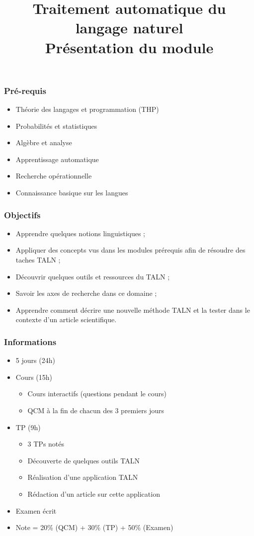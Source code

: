 \documentclass{beamer}
\title[TALN : Présentation] %
{Traitement automatique du langage naturel\\Présentation du module}
\begin{document}
\begin{frame}
\frametitle{Pré-requis}

\begin{itemize}
	\item Théorie des langages et programmation (THP)
	\item Probabilités et statistiques
	\item Algèbre et analyse 
	\item Apprentissage automatique 
	\item Recherche opérationnelle
	\item Connaissance basique sur les langues
\end{itemize}

\end{frame}


\begin{frame}
\frametitle{Objectifs}

\begin{itemize}
	\item Apprendre quelques notions linguistiques ;
	\item Appliquer des concepts vus dans les modules prérequis afin de résoudre des taches TALN ;
	\item Découvrir quelques outils et ressources du TALN ;
	\item Savoir les axes de recherche dans ce domaine ;
	\item Apprendre comment décrire une nouvelle méthode TALN et la tester dans le contexte d'un article scientifique.
\end{itemize}

\end{frame}


\begin{frame}
\frametitle{Informations}

\begin{itemize}
	\item 5 jours (24h)
	\item Cours (15h)
	\begin{itemize}
		\item Cours interactifs (questions pendant le cours)
		\item QCM à la fin de chacun des 3 premiers jours
	\end{itemize}
	\item TP (9h)
	\begin{itemize}
		\item 3 TPs notés
		\item Découverte de quelques outils TALN
		\item Réalisation d'une application TALN
		\item Rédaction d'un article sur cette application
	\end{itemize}
	\item Examen écrit 
	\item Note = 20\% (QCM) + 30\% (TP) + 50\% (Examen)
\end{itemize}

\end{frame}
\end{document}
